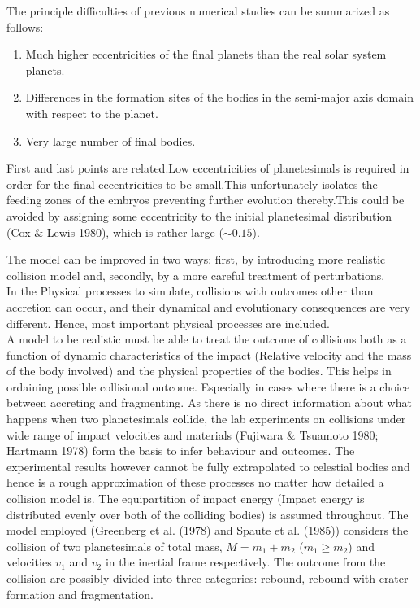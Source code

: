 

The principle difficulties of previous numerical studies can be summarized as follows:
\begin{enumerate}

\item Much higher eccentricities of the final planets than the real solar system planets.
\item Differences in the formation sites of the bodies in the semi-major axis domain with respect to the planet.
\item Very large number of final bodies.
\end{enumerate}

First and last points are related.Low eccentricities of planetesimals is required in order for the final eccentricities to be small.This unfortunately isolates the feeding zones of the embryos preventing further evolution thereby.This could be avoided by assigning some eccentricity to the initial planetesimal distribution (Cox \& Lewis 1980), which is rather large ($\sim 0.15$).

The model can be improved in two ways: first, by introducing more realistic collision model and, secondly, by a more careful treatment of perturbations.\\
In the Physical processes to simulate, collisions with outcomes other than accretion can occur, and their dynamical and evolutionary consequences are very different. Hence, most important physical processes are included.
\\
A model to be realistic must be able to treat the outcome of collisions both as a function of dynamic characteristics  of the impact (Relative velocity and the mass of the body involved) and the physical properties of the bodies. This helps in ordaining possible collisional outcome. Especially in cases where there is a choice between accreting and fragmenting.
As there is no direct information about what happens when two planetesimals collide, the lab experiments on collisions under wide range of impact velocities and materials (Fujiwara \& Tsuamoto 1980; Hartmann 1978) form the basis to infer behaviour and outcomes. The experimental results however cannot be fully extrapolated to celestial bodies and hence is a rough approximation of these processes no matter how detailed a collision model is. The equipartition of impact energy (Impact energy is distributed evenly over both of the colliding bodies) is assumed throughout. The model employed (Greenberg et al. (1978) and Spaute et al. (1985)) considers the collision of two planetesimals of total mass, $M = m_{1}+m_{2}$ ($m_{1} \geq m_{2}$) and velocities $v_{1}$ and $v_{2}$ in the inertial frame respectively. The outcome from the collision are possibly divided into three categories: rebound, rebound with crater formation and fragmentation. 

